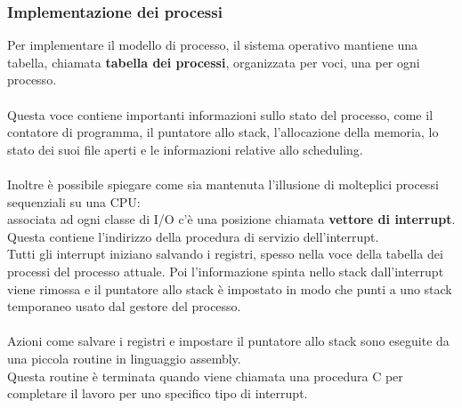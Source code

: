 \documentclass{article}
\begin{document}
\subsubsection{Implementazione dei processi}
Per implementare il modello di processo, il sistema operativo mantiene una tabella, chiamata \textbf{tabella dei processi}, organizzata per voci, una per ogni processo.
\\
\\Questa voce contiene importanti informazioni sullo stato del processo, come il contatore di programma, il puntatore allo stack, l'allocazione della memoria, lo stato dei suoi file aperti e le informazioni 
relative allo scheduling.
\\
\\Inoltre è possibile spiegare come sia mantenuta l'illusione di molteplici processi sequenziali su una CPU:
\\associata ad ogni classe di I/O c'è una posizione chiamata \textbf{vettore di interrupt}. Questa contiene l'indirizzo della procedura di servizio dell'interrupt.\\
Tutti gli interrupt iniziano salvando i registri, spesso nella voce della tabella dei processi del processo attuale. Poi l'informazione spinta nello stack dall'interrupt viene rimossa e il puntatore allo stack è impostato in modo che punti 
a uno stack temporaneo usato dal gestore del processo.
\\
\\
Azioni come salvare i registri e impostare il puntatore allo stack sono eseguite da una piccola routine in linguaggio assembly.
\\Questa routine è terminata quando viene chiamata una procedura C per completare il lavoro per uno specifico tipo di interrupt.
\end{document}
